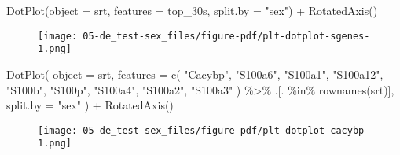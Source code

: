 \documentclass[
  letterpaper,
  DIV=11,
  numbers=noendperiod]{scrartcl}
\newenvironment{Shaded}{\begin{snugshade}}{\end{snugshade}}
\newcommand{\AttributeTok}[1]{\textcolor[rgb]{0.40,0.45,0.13}{#1}}
\newcommand{\FunctionTok}[1]{\textcolor[rgb]{0.28,0.35,0.67}{#1}}
\newcommand{\NormalTok}[1]{\textcolor[rgb]{0.00,0.23,0.31}{#1}}
\newcommand{\SpecialCharTok}[1]{\textcolor[rgb]{0.37,0.37,0.37}{#1}}
\newcommand{\StringTok}[1]{\textcolor[rgb]{0.13,0.47,0.30}{#1}}
\begin{document}
\begin{Shaded}
\begin{Highlighting}[]
\FunctionTok{DotPlot}\NormalTok{(}\AttributeTok{object =}\NormalTok{ srt, }\AttributeTok{features =}\NormalTok{ top\_30s, }\AttributeTok{split.by =} \StringTok{"sex"}\NormalTok{) }\SpecialCharTok{+} \FunctionTok{RotatedAxis}\NormalTok{()}
\end{Highlighting}
\end{Shaded}

\begin{figure}[H]

{\centering \texttt{[image: 05-de\_test-sex\_files/figure-pdf/plt-dotplot-sgenes-1.png]}

}

\end{figure}

\begin{Shaded}
\begin{Highlighting}[]
\FunctionTok{DotPlot}\NormalTok{(}
  \AttributeTok{object =}\NormalTok{ srt,}
  \AttributeTok{features =} \FunctionTok{c}\NormalTok{(}
    \StringTok{"Cacybp"}\NormalTok{, }\StringTok{"S100a6"}\NormalTok{, }\StringTok{"S100a1"}\NormalTok{,}
    \StringTok{"S100a12"}\NormalTok{, }\StringTok{"S100b"}\NormalTok{, }\StringTok{"S100p"}\NormalTok{,}
    \StringTok{"S100a4"}\NormalTok{, }\StringTok{"S100a2"}\NormalTok{, }\StringTok{"S100a3"}
\NormalTok{  ) }\SpecialCharTok{\%\textgreater{}\%}
\NormalTok{    .[. }\SpecialCharTok{\%in\%} \FunctionTok{rownames}\NormalTok{(srt)],}
  \AttributeTok{split.by =} \StringTok{"sex"}
\NormalTok{) }\SpecialCharTok{+} \FunctionTok{RotatedAxis}\NormalTok{()}
\end{Highlighting}
\end{Shaded}

\begin{figure}[H]

{\centering \texttt{[image: 05-de\_test-sex\_files/figure-pdf/plt-dotplot-cacybp-1.png]}

}

\end{figure}
\end{document}

